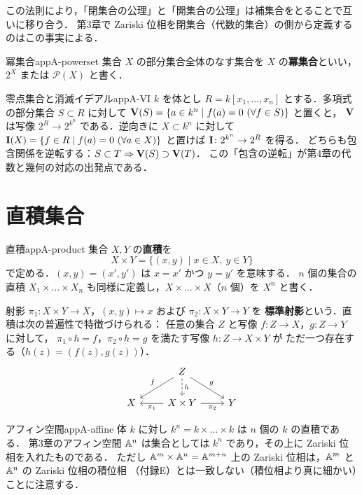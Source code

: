 この法則により，「閉集合の公理」と「開集合の公理」は補集合をとることで互いに移り合う．
第3章で Zariski 位相を閉集合（代数的集合）の側から定義するのはこの事実による．

\begin{mydef}{冪集合}{appA-powerset}
集合 $X$ の部分集合全体のなす集合を $X$ の\textbf{冪集合}といい，$2^X$ または $\mathcal{P}(X)$ と書く．
\end{mydef}

\begin{myex}{零点集合と消滅イデアル}{appA-VI}
$k$ を体とし $R=k[x_1,\dots,x_n]$ とする．多項式の部分集合 $S\subset R$ に対して
$\Zero(S)=\{a\in k^n\mid f(a)=0\ (\forall f\in S)\}$ と置くと，
$\mathbf{V}$ は写像 $2^R\to 2^{k^n}$ である．逆向きに $X\subset k^n$ に対して
$\Ideal(X)=\{f\in R\mid f(a)=0\ (\forall a\in X)\}$ と置けば $\mathbf{I}\colon 2^{k^n}\to 2^R$ を得る．
どちらも包含関係を逆転する：$S\subset T\Rightarrow \mathbf{V}(S)\supset\mathbf{V}(T)$．
この「包含の逆転」が第4章の代数と幾何の対応の出発点である．
\end{myex}

\section{直積集合}

\begin{mydef}{直積}{appA-product}
集合 $X,Y$ の\textbf{直積}を
\[
X\times Y=\{(x,y)\mid x\in X,\ y\in Y\}
\]
で定める．$(x,y)=(x',y')$ は $x=x'$ かつ $y=y'$ を意味する．
$n$ 個の集合の直積 $X_1\times\dots\times X_n$ も同様に定義し，$X\times\dots\times X$（$n$ 個）を $X^n$ と書く．
\end{mydef}

射影 $\pi_1\colon X\times Y\to X$，$(x,y)\mapsto x$ および $\pi_2\colon X\times Y\to Y$ を
\textbf{標準射影}という．直積は次の普遍性で特徴づけられる：
任意の集合 $Z$ と写像 $f\colon Z\to X$，$g\colon Z\to Y$ に対して，
$\pi_1\circ h=f$，$\pi_2\circ h=g$ を満たす写像 $h\colon Z\to X\times Y$ が
ただ一つ存在する（$h(z)=(f(z),g(z))$）．
\[
\begin{tikzcd}
 & Z \arrow[ld,"f"'] \arrow[d,dashed,"h"] \arrow[rd,"g"] & \\
X & X\times Y \arrow[l,"\pi_1"] \arrow[r,"\pi_2"'] & Y
\end{tikzcd}
\]

\begin{myex}{アフィン空間}{appA-affine}
体 $k$ に対し $k^n=k\times\dots\times k$ は $n$ 個の $k$ の直積である．
第3章のアフィン空間 $\mathbb{A}^n$ は集合としては $k^n$ であり，その上に Zariski 位相を入れたものである．
ただし $\mathbb{A}^m\times\mathbb{A}^n=\mathbb{A}^{m+n}$ 上の Zariski 位相は，$\mathbb{A}^m$ と $\mathbb{A}^n$ の Zariski 位相の積位相
（付録E）とは一致しない（積位相より真に細かい）ことに注意する．
\end{myex}

